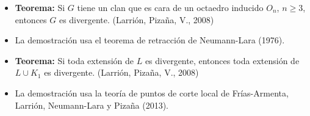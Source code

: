 \documentclass[beamer]{standalone}
\begin{document}
\begin{standaloneframe}
  \begin{itemize}
  \item \textbf{Teorema:} Si $G$ tiene un clan que es cara de un
    octaedro inducido $O_{n}$, $n\geq3$, entonces $G$ es
    divergente. (Larrión, Pizaña, V., 2008)\pause
  \item La demostración usa el teorema de retracción de Neumann-Lara (1976).\pause
  \item \textbf{Teorema:} Si toda extensión de $L$ es divergente,
    entonces toda extensión de $L\cup K_{1}$ es divergente. (Larrión,
    Pizaña, V., 2008)\pause
  \item La demostración usa la teoría de puntos de corte local de
    Frías-Armenta, Larrión, Neumann-Lara y Pizaña (2013).
  \end{itemize}
\end{standaloneframe}
\end{document}

